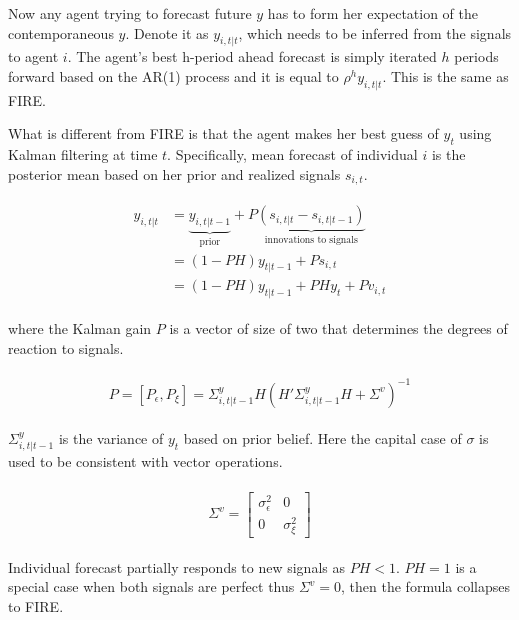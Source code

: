 \documentclass[]{article}
\begin{document}
	
	Now any agent trying to forecast future $y$ has to form her expectation of the contemporaneous $y$. Denote it as  $y_{i,t|t}$, which needs to be inferred from the signals to agent $i$. The agent's best h-period ahead forecast is simply iterated $h$ periods forward based on the AR(1) process and it is equal to $\rho^h y_{i,t|t}$. This is the same as FIRE.
	
	What is different from FIRE is that the agent makes her best guess of $y_t$ using Kalman filtering at time $t$. Specifically, mean forecast of individual $i$ is the posterior mean based on her prior and realized signals $s_{i,t}$. 
	
	
	\begin{eqnarray}
		\begin{aligned}
			y_{i,t|t}  
			& =  \underbrace{y_{i,t|t-1}}_{\text{prior}} + P \underbrace {(s_{i,t|t}-s_{i,t|t-1})}_{\text{innovations to signals}} \\
			& = (1-PH) y_{t|t-1} + Ps_{i,t} \\
			& = (1-PH) y_{t|t-1} + PH y_{t} + P v_{i,t} 
		\end{aligned}
	\end{eqnarray}
	
	where the Kalman gain $P$ is a vector of size of two that determines the degrees of reaction to signals. 
	
	
	\begin{eqnarray}
		\begin{aligned}
			P = [P_\epsilon,P_\xi]= \Sigma^y_{i,t|t-1} H(H'\Sigma^y_{i,t|t-1} H + \Sigma^v)^{-1} 
		\end{aligned}
	\end{eqnarray}
	
	$\Sigma^y_{i,t|t-1}$  is the variance of  $y_t$ based on prior belief. Here the capital case of $\sigma$ is used to be consistent with vector operations. 
	
	\begin{eqnarray}
		\begin{aligned}
			\Sigma^v =  \left[ \begin{matrix} 
				\sigma^2_{\epsilon} &  0 \\ 
				0 & \sigma^2_\xi \end{matrix}\right] 
		\end{aligned}
	\end{eqnarray}
	
	Individual forecast partially responds to new signals as  $PH<1$. $PH=1$ is a special case when both signals are perfect thus $\Sigma^v = 0$, then the formula collapses to FIRE. 
	
\end{document}

